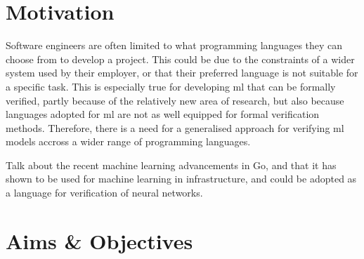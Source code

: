 

\section{Motivation}


Software engineers are often limited to what programming languages they can choose from to develop a project. This could be
due to the constraints of a wider system used by their employer, or that their preferred language is not suitable for 
a specific task. This is especially true for developing \gls{ml} that can be formally verified, partly because of the relatively
new area of research, but also because languages adopted for \gls{ml} are not as well equipped for formal verification methods. Therefore, there is a need
for a generalised approach for verifying \gls{ml} models accross a wider range of programming languages.

Talk about the recent machine learning advancements in Go, and that it has shown to be used for machine learning in infrastructure, and could be 
adopted as a language for verification of neural networks.

\section{Aims \& Objectives}

